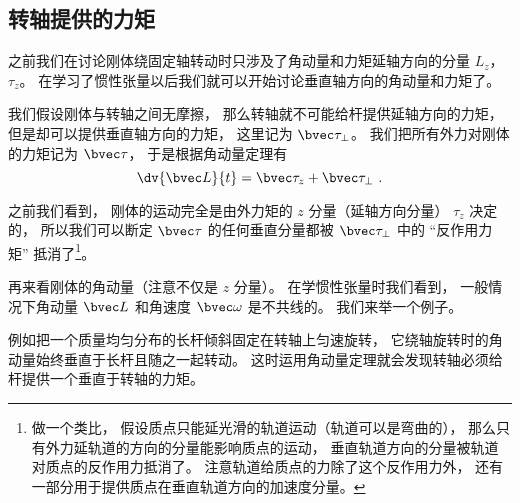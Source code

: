 
\begin{issues}
\issueDraft
\end{issues}


\subsection{转轴提供的力矩}
之前我们在讨论刚体绕固定轴转动时只涉及了角动量和力矩延轴方向的分量 $L_z$， $\tau_z$。 在学习了惯性张量以后我们就可以开始讨论垂直轴方向的角动量和力矩了。


我们假设刚体与转轴之间无摩擦， 那么转轴就不可能给杆提供延轴方向的力矩， 但是却可以提供垂直轴方向的力矩， 这里记为 $\bvec\tau_\bot$。 我们把所有外力对刚体的力矩记为 $\bvec\tau$， 于是根据角动量定理有
\begin{equation}
\dv{\bvec L}{t} = \bvec\tau_z + \bvec\tau_\bot~.
\end{equation}

之前我们看到， 刚体的运动完全是由外力矩的 $z$ 分量（延轴方向分量） $\tau_z$ 决定的， 所以我们可以断定 $\bvec\tau$ 的任何垂直分量都被 $\bvec\tau_\bot$ 中的 “反作用力矩” 抵消了\footnote{做一个类比， 假设质点只能延光滑的轨道运动（轨道可以是弯曲的）， 那么只有外力延轨道的方向的分量能影响质点的运动， 垂直轨道方向的分量被轨道对质点的反作用力抵消了。 注意轨道给质点的力除了这个反作用力外， 还有一部分用于提供质点在垂直轨道方向的加速度分量。}。

再来看刚体的角动量（注意不仅是 $z$ 分量）。 在学惯性张量时我们看到， 一般情况下角动量 $\bvec L$ 和角速度 $\bvec \omega$ 是不共线的。 我们来举一个例子。


\begin{example}{}\label{RBrot2_ex1}
例如把一个质量均匀分布的长杆倾斜固定在转轴上匀速旋转，%
它绕轴旋转时的角动量始终垂直于长杆且随之一起转动。 这时运用角动量定理就会发现转轴必须给杆提供一个垂直于转轴的力矩。
\end{example}